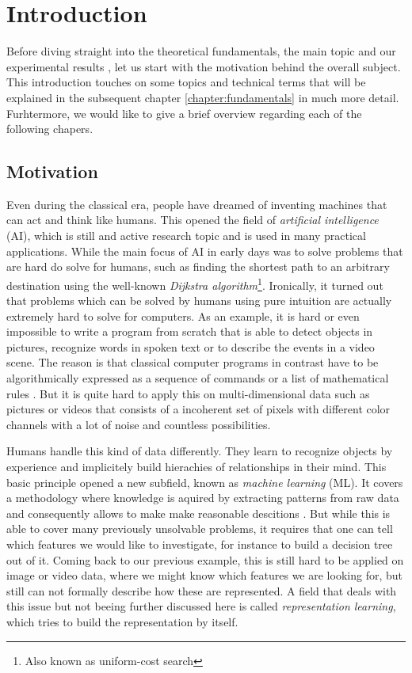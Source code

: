 

\chapter{Introduction} \label{chapter:introduction}

Before diving straight into the theoretical fundamentals, the main topic and  our experimental results , let us start with the motivation behind the overall subject. This introduction touches on some topics and technical terms that will be explained in the subsequent chapter \ref{chapter:fundamentals} in much more detail. Furhtermore, we would like to give a brief overview regarding each of the following chapers.

\section{Motivation}

Even during the classical era, people have dreamed of inventing machines that can act and think like humans. This opened the field of \textit{artificial intelligence} (AI), which is still and active research topic and is used in many practical applications. While the main focus of AI in early days was to solve problems that are hard do solve for humans, such as finding the shortest path to an arbitrary destination using the well-known \textit{Dijkstra algorithm}\footnote{Also known as uniform-cost search}. Ironically, it turned out that problems which can be solved by humans using pure intuition are actually extremely hard to solve for computers. As an example, it is hard or even impossible to write a program from scratch that is able to detect objects in pictures, recognize words in spoken text or to describe the events in a video scene. The reason is that classical computer programs in contrast have to be algorithmically expressed as a sequence of commands or a list of mathematical rules \parencite{deep_learning}. But it is quite hard to apply this on multi-dimensional data such as pictures or videos that consists of a incoherent set of pixels with different color channels with a lot of noise and countless possibilities. 

Humans handle this kind of data differently. They learn to recognize objects by experience and implicitely build hierachies of relationships in their mind. This basic principle opened a new subfield, known as \textit{machine learning} (ML). It covers a methodology where knowledge is aquired by extracting patterns from raw data and consequently allows to make make reasonable descitions \parencite{deep_learning}. But while this is able to cover many previously unsolvable problems, it requires that one can tell which features we would like to investigate, for instance to build a decision tree out of it. Coming back to our previous example, this is still hard to be applied on image or video data, where we might know which features we are looking for, but still can not formally describe how these are represented. A field that deals with this issue but not beeing further discussed here is called \textit{representation learning}, which tries to build the representation by itself.

